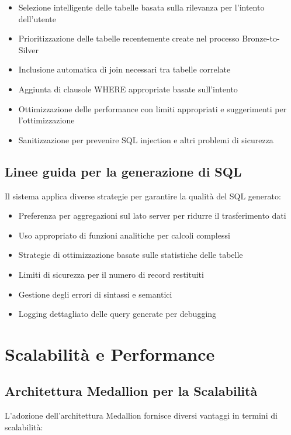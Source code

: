 \documentclass[11pt,a4paper,twoside]{report}
\begin{document}
\begin{itemize}
    \item Selezione intelligente delle tabelle basata sulla rilevanza per l'intento dell'utente
    \item Prioritizzazione delle tabelle recentemente create nel processo Bronze-to-Silver
    \item Inclusione automatica di join necessari tra tabelle correlate
    \item Aggiunta di clausole WHERE appropriate basate sull'intento
    \item Ottimizzazione delle performance con limiti appropriati e suggerimenti per l'ottimizzazione
    \item Sanitizzazione per prevenire SQL injection e altri problemi di sicurezza
\end{itemize}

\section{Linee guida per la generazione di SQL}
Il sistema applica diverse strategie per garantire la qualità del SQL generato:

\begin{itemize}
    \item Preferenza per aggregazioni sul lato server per ridurre il trasferimento dati
    \item Uso appropriato di funzioni analitiche per calcoli complessi
    \item Strategie di ottimizzazione basate sulle statistiche delle tabelle
    \item Limiti di sicurezza per il numero di record restituiti
    \item Gestione degli errori di sintassi e semantici
    \item Logging dettagliato delle query generate per debugging
\end{itemize}

\chapter{Scalabilità e Performance}

\section{Architettura Medallion per la Scalabilità}
L'adozione dell'architettura Medallion fornisce diversi vantaggi in termini di scalabilità:
\end{document}
